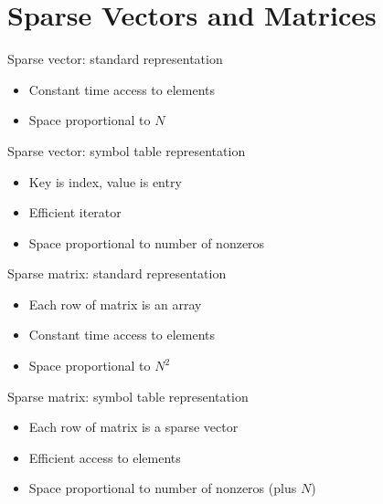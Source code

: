 \documentclass[8pt,a4paper,compress]{beamer}
\begin{document}
\section{Sparse Vectors and Matrices}
\begin{frame}[fragile]
Sparse vector: standard representation
\begin{itemize}
\item Constant time access to elements

\item Space proportional to $N$
\end{itemize}

\bigskip

Sparse vector: symbol table representation
\begin{itemize}
\item Key is index, value is entry

\item Efficient iterator

\item Space proportional to number of nonzeros
\end{itemize}

\bigskip

Sparse matrix: standard representation
\begin{itemize}
\item Each row of matrix is an array

\item Constant time access to elements

\item Space proportional to $N^2$
\end{itemize}

\bigskip

Sparse matrix: symbol table representation
\begin{itemize}
\item Each row of matrix is a sparse vector

\item Efficient access to elements

\item Space proportional to number of nonzeros (plus $N$)
\end{itemize}
\end{frame}
\end{document}
